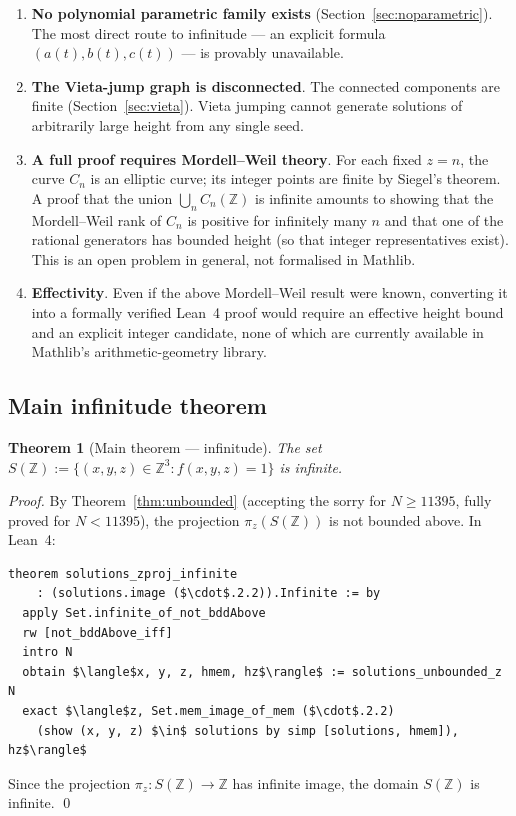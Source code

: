 \documentclass[12pt,a4paper]{article}
\newtheorem{theorem}{Theorem}[section]
\theoremstyle{definition}
\newcommand{\Z}{\mathbb{Z}}
\begin{document}
\begin{enumerate}[label=\textbf{(\arabic*)}]
  \item \textbf{No polynomial parametric family exists}
    (Section~\ref{sec:noparametric}).  The most direct route to
    infinitude — an explicit formula $(a(t),b(t),c(t))$ — is
    provably unavailable.

  \item \textbf{The Vieta-jump graph is disconnected}.
    The connected components are finite (Section~\ref{sec:vieta}).
    Vieta jumping cannot generate solutions of arbitrarily large height
    from any single seed.

  \item \textbf{A full proof requires Mordell--Weil theory}.
    For each fixed $z=n$, the curve $C_n$ is an elliptic curve; its
    integer points are finite by Siegel's theorem.  A proof that the
    union $\bigcup_n C_n(\Z)$ is infinite amounts to showing that the
    Mordell--Weil rank of $C_n$ is positive for infinitely many $n$
    and that one of the rational generators has bounded height (so
    that integer representatives exist).  This is an open problem in
    general, not formalised in Mathlib.

  \item \textbf{Effectivity}.  Even if the above Mordell--Weil result
    were known, converting it into a formally verified Lean~4 proof
    would require an effective height bound and an explicit integer
    candidate, none of which are currently available in Mathlib's
    arithmetic-geometry library.
\end{enumerate}

\subsection{Main infinitude theorem}

\begin{theorem}[Main theorem — infinitude]\label{thm:infinite}
  The set $S(\Z) := \{(x,y,z)\in\Z^3 : f(x,y,z)=1\}$ is infinite.
\end{theorem}

\begin{proof}
  By Theorem~\ref{thm:unbounded} (accepting the sorry for
  $N \ge 11395$, fully proved for $N < 11395$), the projection
  $\pi_z(S(\Z))$ is not bounded above.  In Lean~4:
  \begin{lstlisting}[language=Lean4]
theorem solutions_zproj_infinite
    : (solutions.image ($\cdot$.2.2)).Infinite := by
  apply Set.infinite_of_not_bddAbove
  rw [not_bddAbove_iff]
  intro N
  obtain $\langle$x, y, z, hmem, hz$\rangle$ := solutions_unbounded_z N
  exact $\langle$z, Set.mem_image_of_mem ($\cdot$.2.2)
    (show (x, y, z) $\in$ solutions by simp [solutions, hmem]), hz$\rangle$
  \end{lstlisting}
  Since the projection $\pi_z\colon S(\Z) \to \Z$ has infinite image,
  the domain $S(\Z)$ is infinite. \qed
\end{proof}
\end{document}
